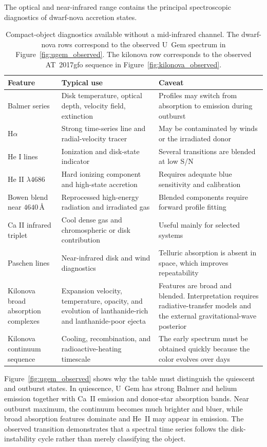 \documentclass[10pt,onecolumn]{article}
\begin{document}
The optical and near-infrared range contains the principal spectroscopic
diagnostics of dwarf-nova accretion states.

\begin{table}[H]
\centering
\caption{Compact-object diagnostics available without a mid-infrared channel.
The dwarf-nova rows correspond to the observed U~Gem spectrum in
Figure~\ref{fig:ugem_observed}. The kilonova row corresponds to the observed
AT~2017gfo sequence in Figure~\ref{fig:kilonova_observed}.}
\label{tab:dwarf_lines}
\begin{tabularx}{\textwidth}{@{}P{28mm} P{37mm} Y@{}}
\toprule
\textbf{Feature} & \textbf{Typical use} & \textbf{Caveat}\\
\midrule
Balmer series & Disk temperature, optical depth, velocity field, extinction &
Profiles may switch from absorption to emission during outburst\\
H$\alpha$ & Strong time-series line and radial-velocity tracer &
May be contaminated by winds or the irradiated donor\\
He I lines & Ionization and disk-state indicator &
Several transitions are blended at low S/N\\
He II $\lambda4686$ & Hard ionizing component and high-state accretion &
Requires adequate blue sensitivity and calibration\\
Bowen blend near $4640$\,\AA & Reprocessed high-energy radiation and irradiated gas &
Blended components require forward profile fitting\\
Ca II infrared triplet & Cool dense gas and chromospheric or disk contribution &
Useful mainly for selected systems\\
Paschen lines & Near-infrared disk and wind diagnostics &
Telluric absorption is absent in space, which improves repeatability\\
Kilonova broad absorption complexes & Expansion velocity, temperature,
opacity, and evolution of lanthanide-rich and lanthanide-poor ejecta &
Features are broad and blended. Interpretation requires radiative-transfer
models and the external gravitational-wave posterior\\
Kilonova continuum sequence & Cooling, recombination, and radioactive-heating
timescale &
The early spectrum must be obtained quickly because the color evolves over
days\\
\bottomrule
\end{tabularx}
\end{table}

Figure~\ref{fig:ugem_observed} shows why the table must distinguish the
quiescent and outburst states. In quiescence, U~Gem has strong Balmer and
helium emission together with Ca~II emission and donor-star absorption bands.
Near outburst maximum, the continuum becomes much brighter and bluer, while
broad absorption features dominate and He~II may appear in emission. The
observed transition demonstrates that a spectral time series follows the
disk-instability cycle rather than merely classifying the object.
\end{document}
